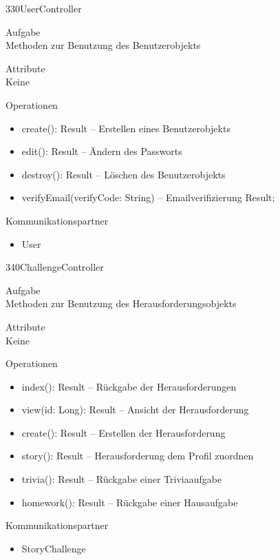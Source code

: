 \newpage
\begin{class}{330}{UserController}
\item[Aufgabe]~\\
Methoden zur Benutzung des Benutzerobjekts
\item[Attribute]~\\
Keine
\item[Operationen]~\\
\begin{itemize}
\item create(): Result -- Erstellen eines Benutzerobjekts
\item edit(): Result -- Ändern des Passworts
\item destroy(): Result -- Löschen des Benutzerobjekts 
\item verifyEmail(verifyCode: String) -- Emailverifizierung
   Result;
\end{itemize}
\item[Kommunikationspartner]~\\
\begin{itemize}
\item User
\end{itemize}
\end{class}

\newpage
\begin{class}{340}{ChallengeController}
\item[Aufgabe]~\\
Methoden zur Benutzung des Herausforderungsobjekts
\item[Attribute]~\\
Keine
\item[Operationen]~\\
\begin{itemize}
\item index(): Result -- Rückgabe der Herausforderungen
\item view(id: Long): Result -- Ansicht der Herausforderung
\item create(): Result -- Erstellen der Herausforderung
\item story(): Result -- Herausforderung dem Profil zuordnen
\item trivia(): Result -- Rückgabe einer Triviaaufgabe
\item homework(): Result -- Rückgabe einer Hausaufgabe
\end{itemize}
\item[Kommunikationspartner]~\\
\begin{itemize}
\item StoryChallenge
\end{itemize}
\end{class}

